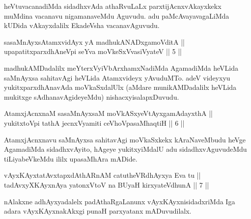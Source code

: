 \begin{artha}
heVtuvacanadiMda sidadhxvAda athaRvuLaLx parxtijAcnxvAkayxkekx muMdina vacanavu nigamanaveMdu Aguvudu. adu paMcAvayavagaLiMda kUDida vAkayxdalilx EkadeVsha vacanavAguvudu.
\end{artha}


\begin{shl}
sasaMnAyxsA\s \s tamxvidAyx yA madhukANADxgamoVditA ||  \\
upapatitxparxdhAneV\s pi seYva moVkeSxV\s vasiVyateV \hfill || 5 ||  
\end{shl}

\begin{artha}
madhukAMDadalilx meYterxVyiVbArxhamxNadiMda AgamadiMda heVLida saMnAyxsa sahitavAgi heVLida Atamxvideyx yAvuduMTo. adeV videyxyu yukitxparxdhAnavAda moVkaSxdalUlx (aMdare munikAMDadalilx heVLida mukitxge sAdhanavAgideyeMdu) nishacxyisalapxDuvudu. 
\end{artha}


\begin{shl}
AtamxjAcnxnaM sasaMnAyxsaM moVkASxyeVtAyxgamAdayxthA || \\
yukitxtoV\s pi tathA jecnxVyamiti ceVhoVpasaMhaqtiH \hfill || 6 ||  
\end{shl}

\begin{artha}
AtamxjAcnxnavu saMnAyxsa sahitavAgi moVkaSxkekx kAraNaveMbudu heVge AgamadiMda sidadhxvAyito, hAgeye yukitxyiMdalU adu sidadhxvAguvudeMdu tiLiyabeVkeMdu ililx upasaMhAra mADide.
\end{artha}

\begin{shl}
vAyxKAyxtatAvxtapxdAthARnAM catutheVR\s dhAyxya Eva tu || \\
tadAvxyXKAyxnAya yatonxV\s toV na BUyaH kirxyateV\s dhunA \hfill || 7 ||  
\end{shl}	

\begin{artha}
nAlakxne adhAyxyadalelx padAthaRgaLanunx vAyxKAyxnisidadxriMda Iga adara vAyxKAyxnakAkxgi punaH parxyatanx mADuvudilalx.
\end{artha}



